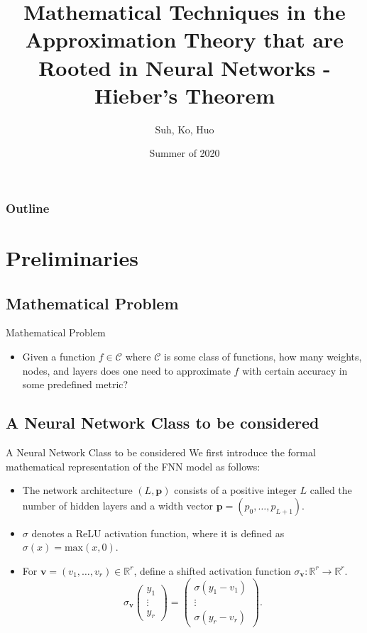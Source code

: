 \documentclass{if-beamer}
\title[Neural Networks in Approximation]{Mathematical Techniques in the Approximation Theory that are Rooted in Neural Networks - Hieber's Theorem}
\author{Suh, Ko, Huo}
\institute{Georgia Tech}
\date{Summer of 2020}
\begin{document}
\begin{frame}
  \titlepage
\end{frame}

\begin{frame}
    \frametitle{Outline}
    \begin{multicols}{2}
        \tableofcontents
    \end{multicols}
\end{frame}

\section{Preliminaries}
\subsection{Mathematical Problem}
\begin{frame}{Mathematical Problem}
\begin{itemize}
    \item Given a function $f \in \mathcal{C}$ where $\mathcal{C}$ is some class of functions, how many weights, nodes, and layers does one need to approximate $f$ with certain accuracy in some predefined metric?
\end{itemize}
\end{frame}

\subsection{A Neural Network Class to be considered}
\begin{frame}{A Neural Network Class to be considered}
    We first introduce the formal mathematical representation of the FNN model as follows: 
    \begin{itemize}
        \item The network architecture $(L,\textbf{p})$ consists of a positive integer $L$ called the number of hidden layers and a width vector $\textbf{p}=(p_0,\dots,p_{L+1})$. 
        
        \item $\sigma$ denotes a ReLU activation function, where it is defined as $\sigma(x)=\mbox{max}(x,0)$. 
        
        \item For $\textbf{v}=(v_{1},\dots,v_{r})\in\mathbb{R}^{r}$, define a shifted activation function $\sigma_{\textbf{v}}:\mathbb{R}^{r}\rightarrow{\mathbb{R}^{r}}$. 
        \begin{equation*}
            \sigma_{\textbf{v}}
            \begin{pmatrix} y_{1} \\ \vdots \\ y_{r}\end{pmatrix}
            =
            \begin{pmatrix} \sigma( y_{1} - v_{1} ) \\ \vdots \\ \sigma( y_{r} - v_{r} ) \end{pmatrix}.
        \end{equation*}
    \end{itemize}
\end{frame}
\end{document}
